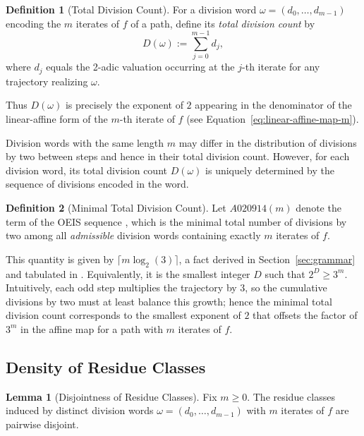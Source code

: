 \documentclass[12pt, oneside]{article}   	%
\numberwithin{equation}{section}          %
\theoremstyle{definition}
\newtheorem{define}{Definition}[section]
\newtheorem{lemma}[theorem]{Lemma}
\begin{document}
\begin{define}[Total Division Count]
For a division word $\omega = (d_0,\dots,d_{m-1})$ encoding the $m$ iterates of $f$
of a path, define its \emph{total division count} by
\[
D(\omega) := \sum_{j=0}^{m-1} d_j,
\]
where $d_j$ equals the 2-adic valuation occurring at the $j$-th iterate for any
trajectory realizing $\omega$.
\end{define}

Thus $D(\omega)$ is precisely the exponent of $2$ appearing in the
denominator of the linear-affine form of the $m$-th iterate of $f$ (see
Equation~\eqref{eq:linear-affine-map-m}).

Division words with the same length $m$ may differ in the distribution of
divisions by two between steps and hence in their total division count.
However, for each division word, its total division count $D(\omega)$ is
uniquely determined by the sequence of divisions encoded in the word.

\begin{define}[Minimal Total Division Count]
Let $A020914(m)$ denote the term of the OEIS sequence , 
which is the minimal total number of divisions by two among all
\emph{admissible} division words containing exactly $m$ iterates of $f$.
\end{define}

This quantity is given by $\lceil m \log_2(3) \rceil$, a fact derived in
Section~\ref{sec:grammar} and tabulated in .  Equivalently,
it is the smallest integer $D$ such that $2^D \ge 3^m$. Intuitively,
each odd step multiplies the trajectory by $3$, so the cumulative divisions
by two must at least balance this growth; hence the minimal total division
count corresponds to the smallest exponent of $2$ that offsets the factor
of $3^m$ in the affine map for a path with $m$ iterates of $f$.


\subsection{Density of Residue Classes}

\begin{lemma}[Disjointness of Residue Classes]
Fix $m \ge 0$. The residue classes induced by distinct division words
\(\omega = (d_0,\dots,d_{m-1})\) with $m$ iterates of $f$ are pairwise disjoint.
\end{lemma}
\end{document}
